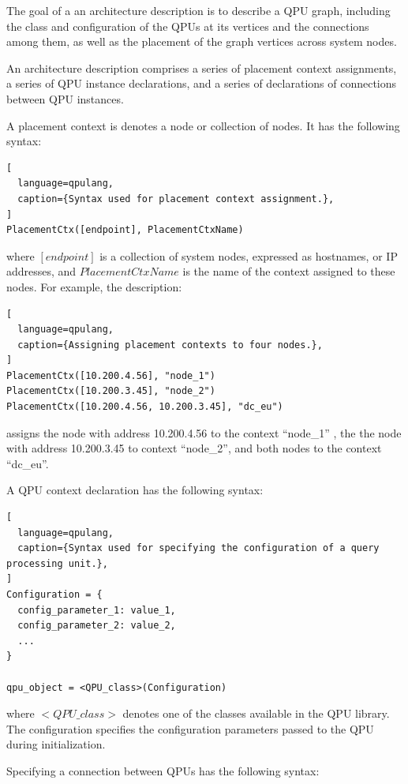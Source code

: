 The goal of a an architecture description is to describe a QPU graph,
including the class and configuration of the QPUs at its vertices and the connections among them,
as well as the placement of the graph vertices across system nodes.

An architecture description comprises a series of placement context assignments,
a series of QPU instance declarations, and a series of declarations of connections between QPU instances.

A placement context is denotes a node or collection of nodes.
It has the following syntax:

\begin{lstlisting}[
  language=qpulang,
  caption={Syntax used for placement context assignment.},
]
PlacementCtx([endpoint], PlacementCtxName)
\end{lstlisting}

\noindent
where $[endpoint]$ is a collection of system nodes, expressed as hostnames, or IP addresses,
and $PlacementCtxName$ is the name of the context assigned to these nodes.
For example, the description:

\begin{lstlisting}[
  language=qpulang,
  caption={Assigning placement contexts to four nodes.},
]
PlacementCtx([10.200.4.56], "node_1")
PlacementCtx([10.200.3.45], "node_2")
PlacementCtx([10.200.4.56, 10.200.3.45], "dc_eu")
\end{lstlisting}

\noindent
assigns the node with address 10.200.4.56 to the context ``node\_1'' ,
the the node with address 10.200.3.45  to context ``node\_2'',
and both nodes to the context ``dc\_eu''.

\medskip
\noindent
A QPU context declaration has the following syntax:

\begin{lstlisting}[
  language=qpulang,
  caption={Syntax used for specifying the configuration of a query processing unit.},
]
Configuration = {
  config_parameter_1: value_1,
  config_parameter_2: value_2,
  ...
}

qpu_object = <QPU_class>(Configuration)
\end{lstlisting}

\noindent
where $<QPU\_class>$ denotes one of the classes available in the QPU library.
The configuration specifies the configuration parameters passed to the QPU during initialization.

\medskip
\noindent
Specifying a connection between QPUs has the following syntax:

